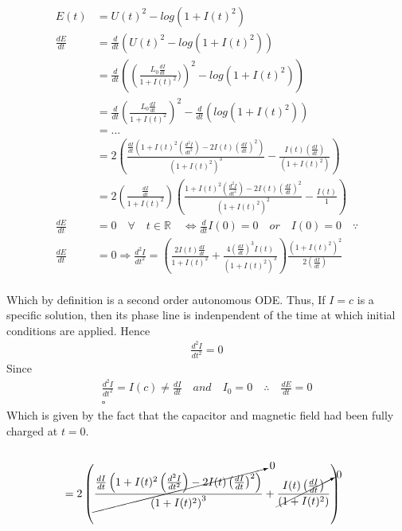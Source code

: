 \documentclass[a4paper]{article}
\begin{document}
\begin{equation*}
\begin{aligned}
\end{aligned}
\end{equation*}
\LARGE
\begin{align*}
E(t) & = U(t)^{2}-log(1+I(t)^{2})\\
\frac{dE}{dt} & = \frac{d}{dt}\left(U(t)^{2}-log(1+I(t)^{2})\right)\\
 & = \frac{d}{dt}\left(\left(\frac{L_{0}\frac{dI}{dt}}{1+I(t)^{2}})\right)^{2}-log\left(1+I(t)^{2}\right)\right) \\
& = \frac{d}{dt}\left(\frac{L_{0}\frac{dI}{dt}}{1+I(t)^{2}}\right)^{2}-\frac{d}{dt}\left(log\left(1+I(t)^{2}\right)\right)\\
& = ...\\
& = 2\left({\frac{\frac{dI}{dt}\left(1+I(t)^{2}\left(\frac{d^{2}I}{dt^{2}}\right)-2I(t)\left(\frac{dI}{dt}\right)^{2}\right)}{\left(1+I(t)^{2}\right)^{3}}} -   {\frac{I(t)\left(\frac{dI}{dt}\right)}{\left(1+I(t)^{2}\right)}}\right)\\
& = 2\left(\frac{\frac{dI}{dt}}{1+I(t)^{2}}\right)   \left({\frac{1+I(t)^{2}\left(\frac{d^{2}I}{dt^{2}}\right)-2I(t)\left(\frac{dI}{dt}\right)^{2}}{\left(1+I(t)^{2}\right)^{2}}} -   {\frac{I(t)}{1}}\right)\\
\frac{dE}{dt} & = 0 \quad \forall \quad t \in \mathbb{R} \quad \Longleftrightarrow \frac{d}{dt}I(0) = 0 \quad or \quad I(0)= 0 \quad \because \\
\frac{dE}{dt} &= 0 \Longrightarrow 
{\frac{d^{2}I}{dt^{2}}}=\left(\frac{2I(t)\frac{dI}{dt}}{1+I(t)^{2}}+\frac{4\left(\frac{dI}{dt}\right)^{3}I(t)}{\left(1+I(t)^{2}\right)^{3}}\right)\frac{\left(1+I(t)^{2}\right)^{2}}{2\left(\frac{dI}{dt}\right)}
\end{align*}\\
Which by definition is a second order autonomous ODE. Thus, If $I=c$ is a specific solution, then its phase line is indenpendent of the time at which initial conditions are applied. Hence
\begin{align*}
\frac{d^{2}I}{dt^{2}}=0
\end{align*}
Since 
\begin{align*}
\frac{d^{2}I}{dt^{2}}=I(c)\ne\frac{dI}{dt}\quad and\quad I_{0}=0 \quad \therefore\quad\frac{dE}{dt}=0\\
\square
\end{align*}
Which is given by the fact that the capacitor and magnetic field had been fully charged at $t=0$.

\begin{align*}
\end{align*}
\begin{align*}
& = 2\left(\cancelto{0}{\frac{\frac{dI}{dt}\left(1+I(t)^{2}\left(\frac{d^{2}I}{dt^{2}}\right)-2I(t)\left(\frac{dI}{dt}\right)^{2}\right)}{\left(1+I(t)^{2}\right)^{3}}} +   \cancelto{0}{\frac{I(t)\left(\frac{dI}{dt}\right)}{\left(1+I(t)^{2}\right)}}\right)
\end{align*}
\end{document}
